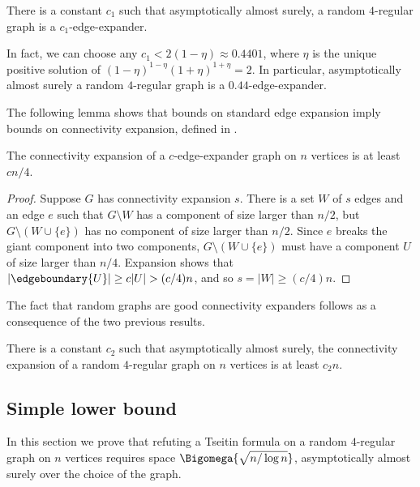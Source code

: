 \documentclass{toc}
\begin{document}
%
%

\begin{theorem} \label{thm:expander}
There is a constant $c_1$ such that asymptotically almost surely, a random $4$-regular graph
is a $c_1$-edge-expander.
\end{theorem}

In fact, we can choose any $c_1 < 2(1-\eta) \approx 0.4401$, where $\eta$ is the unique positive solution of $(1-\eta)^{1-\eta} (1+\eta)^{1+\eta} = 2$. In particular, asymptotically almost surely a random $4$-regular graph is a $0.44$-edge-expander.

%
The following lemma shows that bounds on standard edge expansion imply bounds on connectivity expansion, defined in .

%
%
%
%
%
%

%
%
%
%
%
%
\begin{lemma} \label{lem:edge-to-connectivity}
  The connectivity expansion of a $c$-edge-expander graph on $n$ vertices is at least $cn/4$.
\end{lemma}
\begin{proof}
  Suppose $G$ has connectivity expansion $s$. There is a set $W$ of $s$ edges and an edge $e$ such that $G \setminus W$ has a component of size larger than $n/2$, but $G \setminus (W \cup \{e\})$ has no component of size larger than $n/2$. Since $e$ breaks the giant component into two components, $G \setminus (W \cup \{e\})$ must have a component $U$ of size larger than $n/4$. Expansion shows that
$|\edgeboundary{U}| \geq c |U| > (c/4) n$, and so $s = |W| \geq (c/4) n$.
\end{proof}

The fact that random graphs are good connectivity expanders follows as a consequence of the two previous results.
\begin{corollary}
\label{cor:splitting}
There is a constant $c_2$ such that asymptotically almost surely, the connectivity expansion
of a random $4$-regular graph on $n$ vertices is at least $c_2n$.
\end{corollary}

\subsection{Simple lower bound} \label{sec:simple}

In this section we prove that refuting a \Gnonsplitting Tseitin formula on a random $4$-regular graph on $n$ vertices requires space $\Bigomega{\sqrt{n/\log n}}$, asymptotically almost surely over the choice of the graph.
\end{document}
